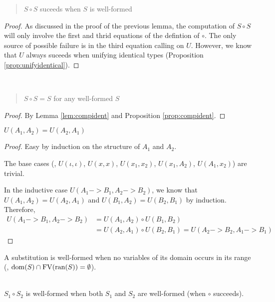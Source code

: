 \begin{proposition}
	\label{prop:compident}
\begin{quote} $S \circ S$ suceeds when $S$ is well-formed \end{quote}
\end{proposition}
\begin{proof}
As discussed in the proof of the previous lemma,
the computation of $S \circ S$ will only involve
the first and thrid equations of the defintion of $\circ$.
The only source of possible failure is in the third equation calling on $U$.
However, we know that $U$ always suceeds when unifying identical types
(Proposition \ref{prop:unifyidentical}).
\end{proof}

\begin{theorem} ~
	\begin{quote} $S\circ S = S$ for any well-formed $S$ \end{quote}
\end{theorem}
\begin{proof}
	By Lemma \ref{lem:compident} and Proposition \ref{prop:compident}.
\end{proof}

\begin{theorem} $ U(A_1,A_2) = U(A_2,A_1) $
	\label{thm:commU}
\end{theorem}
\begin{proof} Easy by induction on the structure of $A_1$ and $A_2$.

The base cases (\ie, $U(\iota,\iota)$, $U(x,x)$, $U(x_1,x_2)$,
			$U(x_1,A_2)$, $U(A_1,x_2)$) are trivial.

In the inductive case $U(A_1 -> B_1, A_2 -> B_2)$, we know that
$U(A_1,A_2) = U(A_2,A_1)$ and $U(B_1,A_2) = U(B_2,B_1)$ by induction.
Therefore,
\begin{align*}
U(A_1 -> B_1, A_2 -> B_2)
	&= U(A_1,A_2) \circ U(B_1,B_2) \\
	&= U(A_2,A_1) \circ U(B_2,B_1) = U(A_2 -> B_2, A_1 -> B_1)
\end{align*}
\end{proof}



A substitution is well-formed when no variables of its domain
occurs in its range (\ie, $\mathop{\mathrm{dom}}(S)\cap\mathop{\mathrm{FV}}(\mathop{\mathrm{ran}}(S))=\emptyset$).

\begin{proposition}~\\
	\indent
$S_1\circ S_2$ is well-formed when both $S_1$ and $S_2$ are well-formed
(when $\circ$ succeeds).
\end{proposition}

